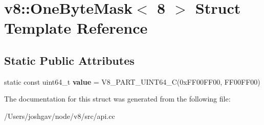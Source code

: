 \hypertarget{structv8_1_1_one_byte_mask_3_018_01_4}{}\section{v8\+:\+:One\+Byte\+Mask$<$ 8 $>$ Struct Template Reference}
\label{structv8_1_1_one_byte_mask_3_018_01_4}
\subsection*{Static Public Attributes}
\begin{DoxyCompactItemize}
\item 
static const uint64\+\_\+t {\bfseries value} = V8\+\_\+P\+A\+R\+T\+\_\+\+U\+I\+N\+T64\+\_\+C(0x\+F\+F00\+F\+F00, F\+F00\+F\+F00)\hypertarget{structv8_1_1_one_byte_mask_3_018_01_4_a83c02b01faa83dddabc00e630be15458}{}\label{structv8_1_1_one_byte_mask_3_018_01_4_a83c02b01faa83dddabc00e630be15458}

\end{DoxyCompactItemize}


The documentation for this struct was generated from the following file\+:\begin{DoxyCompactItemize}
\item 
/\+Users/joshgav/node/v8/src/api.\+cc\end{DoxyCompactItemize}
